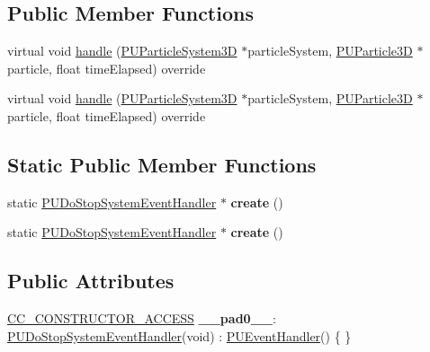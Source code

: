 \subsection*{Public Member Functions}
\begin{DoxyCompactItemize}
\item 
virtual void \hyperlink{classPUDoStopSystemEventHandler_aedf9765b3b2652fd3828f4be017a727c}{handle} (\hyperlink{classPUParticleSystem3D}{P\+U\+Particle\+System3D} $\ast$particle\+System, \hyperlink{structPUParticle3D}{P\+U\+Particle3D} $\ast$particle, float time\+Elapsed) override
\item 
virtual void \hyperlink{classPUDoStopSystemEventHandler_ad80081500e5553c7a76c2f0b966b9f42}{handle} (\hyperlink{classPUParticleSystem3D}{P\+U\+Particle\+System3D} $\ast$particle\+System, \hyperlink{structPUParticle3D}{P\+U\+Particle3D} $\ast$particle, float time\+Elapsed) override
\end{DoxyCompactItemize}
\subsection*{Static Public Member Functions}
\begin{DoxyCompactItemize}
\item 
\mbox{\label{classPUDoStopSystemEventHandler_a0f0eb12439a9fdcefcb912a2419ba6e3}} 
static \hyperlink{classPUDoStopSystemEventHandler}{P\+U\+Do\+Stop\+System\+Event\+Handler} $\ast$ {\bfseries create} ()
\item 
\mbox{\label{classPUDoStopSystemEventHandler_a0001b30a3d550b27fe22bd5e15bcfd6c}} 
static \hyperlink{classPUDoStopSystemEventHandler}{P\+U\+Do\+Stop\+System\+Event\+Handler} $\ast$ {\bfseries create} ()
\end{DoxyCompactItemize}
\subsection*{Public Attributes}
\begin{DoxyCompactItemize}
\item 
\mbox{\label{classPUDoStopSystemEventHandler_a86b88d8a60d19dd4c3d3c8ac0ec88d58}} 
\hyperlink{_2cocos2d_2cocos_2base_2ccConfig_8h_a25ef1314f97c35a2ed3d029b0ead6da0}{C\+C\+\_\+\+C\+O\+N\+S\+T\+R\+U\+C\+T\+O\+R\+\_\+\+A\+C\+C\+E\+SS} {\bfseries \+\_\+\+\_\+pad0\+\_\+\+\_\+}\+: \hyperlink{classPUDoStopSystemEventHandler}{P\+U\+Do\+Stop\+System\+Event\+Handler}(void) \+: \hyperlink{classPUEventHandler}{P\+U\+Event\+Handler}() \{ \}
\end{DoxyCompactItemize}
